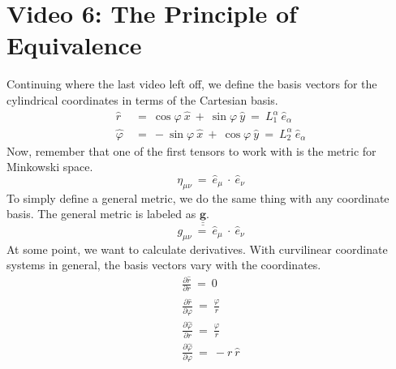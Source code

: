 \section*{Video 6: The Principle of Equivalence}
\hskip 25pt Continuing where the last video left off, we define the basis vectors for the cylindrical coordinates in terms
of the Cartesian basis.
\begin{equation}
  \begin{aligned}
    \widehat{r}\ &=\ \cos\varphi\ \hat{x}\ +\ \sin\varphi\ \hat{y}\ =\ L^{\alpha}_{1}\ \hat{e}_{\alpha}\\
    \widehat{\varphi}\ &=\ -\sin\varphi\ \hat{x}\ +\ \cos\varphi\ \hat{y}\ =\ L^{\alpha}_{2}\ \hat{e}_{\alpha}
  \end{aligned}
\end{equation}
Now, remember that one of the first tensors to work with is the metric for Minkowski space.
\begin{equation}
  \eta_{\mu\nu}\ =\ \hat{e}_{\mu}\ \cdot\ \hat{e}_{\nu}
\end{equation}
To simply define a general metric, we do the same thing with any coordinate basis.  The general metric is labeled as
$\underline{\underline{\mathbf{g}}}$.
\begin{equation}
  g_{\mu\nu}\ =\ \hat{e}_{\mu}\ \cdot\ \hat{e}_{\nu}
\end{equation}
At some point, we want to calculate derivatives.  With curvilinear coordinate systems in general, the basis vectors
vary with the coordinates.
\begin{gather}
  \frac{\partial\hat{r}}{\partial r}\ =\ 0 \\
  \frac{\partial\hat{r}}{\partial\varphi}\ =\ \frac{\widehat{\varphi}}{r} \\
  \frac{\partial\widehat{\varphi}}{\partial r}\ =\ \frac{\widehat{\varphi}}{r} \\
  \frac{\partial\widehat{\varphi}}{\partial\varphi}\ =\ -r\ \hat{r}
\end{gather}

